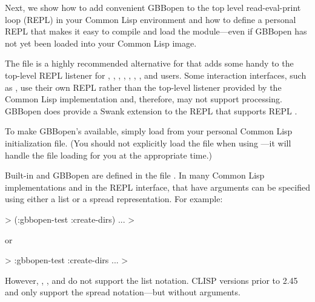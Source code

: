 \documentclass[10pt,twoside,english,pdftex]{article}
\begin{document}
Next, we show how to add convenient GBBopen  to the
top level read-eval-print loop (REPL) in your Common Lisp environment and how
to define a personal REPL  that makes it easy to compile and
load the  module---even if GBBopen has not yet been
loaded into your Common Lisp image.

%
%
%
The file  is a highly
recommended alternative for
 that adds some handy
 to the top-level REPL listener for
%
,
,
,
,
,
,
, and
%
users.  Some interaction interfaces, such as
, use their own REPL
rather than the top-level listener provided by the Common Lisp implementation
and, therefore, may not support  
processing.  GBBopen does provide a Swank extension to the
 REPL that supports
REPL .

To make GBBopen's  available, simply load
 from your personal
Common Lisp initialization file.  (You should not explicitly load the
 file when using
---it will handle the
 file loading for you at
the appropriate time.)

Built-in and GBBopen  are defined in the file
.  In many Common Lisp
implementations and in the
 REPL interface,
 that have arguments can be specified using either a list
or a spread representation.  For example:
%
\W\supp
\begin{example}
  > (:gbbopen-test :create-dirs)
       ...
  >
\end{example}
%
or
%
\W\supp\notpretop
\begin{example}
  > :gbbopen-test :create-dirs
       ...
  >
\end{example}
%
However, ,
, and
 do not support the list
notation.  CLISP versions prior to 2.45 and
 only support the spread
notation---but without arguments.
\end{document}
